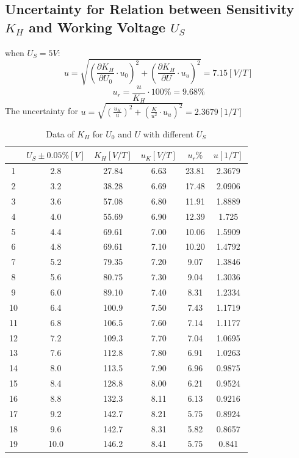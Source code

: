 \documentclass[12pt]{article}
\begin{document}
\subsection{Uncertainty for Relation between Sensitivity $K_H$ and Working Voltage $U_S$}
when $U_S=5V$:
$$u=\sqrt{(\frac{\partial K_H}{\partial U_0}\cdot u_0)^2+(\frac{\partial K_H}{\partial U}\cdot u_u)^2}=7.15[V/T]$$
$$u_r=\frac{u}{K_H}\cdot100\%=9.68\%$$
The uncertainty for $u=\sqrt{(\frac{u_K}{u})^2+(\frac{K}{u^2}\cdot u_u)^2}=2.3679[1/T]$
\begin{table}[H]
\centering
\begin{tabular}{|c|c|c|c|c|c|}
\hline
&$U_S\pm0.05\%[V]$&$K_H[V/T]$&$u_K[V/T]$&$u_r\%$&$u[1/T]$   \\ \hline
1&2.8    &27.84&6.63&23.81&2.3679  \\ \hline
2 &3.2   &38.28&6.69&17.48&2.0906  \\ \hline
3 &3.6   &57.08&6.80&11.91&1.8889  \\ \hline
4 &4.0   &55.69&6.90&12.39&1.725  \\ \hline
5 &4.4   &69.61&7.00&10.06&1.5909  \\ \hline
6 &4.8   &69.61&7.10&10.20&1.4792  \\ \hline
7 &5.2   &79.35&7.20&9.07 &1.3846 \\ \hline
8 &5.6   &80.75&7.30&9.04 &1.3036 \\ \hline
9 &6.0   &89.10&7.40&8.31 &1.2334 \\ \hline
10 &6.4  &100.9&7.50&7.43 &1.1719 \\ \hline
11 &6.8  &106.5&7.60&7.14 &1.1177 \\ \hline
12 &7.2  &109.3&7.70&7.04 &1.0695 \\ \hline
13 &7.6  &112.8&7.80&6.91 &1.0263 \\ \hline
14 &8.0  &113.5&7.90&6.96 &0.9875 \\ \hline
15 &8.4  &128.8&8.00&6.21 &0.9524 \\ \hline
16 &8.8  &132.3&8.11&6.13 &0.9216 \\ \hline
17 &9.2  &142.7&8.21&5.75 &0.8924 \\ \hline
18 &9.6  &142.7&8.31&5.82 &0.8657 \\ \hline
19 &10.0 &146.2&8.41&5.75 &0.841 \\ \hline
\end{tabular}
\caption{Data of $K_H$ for $U_0$ and $U$ with different $U_S$}
\end{table}
\end{document}
